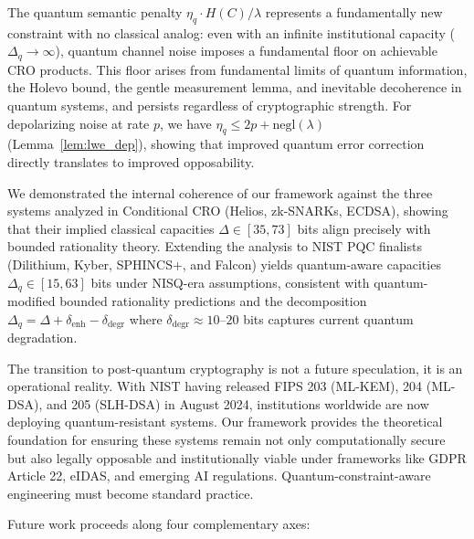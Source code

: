 \documentclass{ieeeaccess}
\begin{document}
The quantum semantic penalty $\eta_q \cdot H(C)/\lambda$ represents a fundamentally 
new constraint with no classical analog: even with an infinite institutional capacity 
($\Delta_q \to \infty$), quantum channel noise imposes a fundamental floor on 
achievable CRO products. This floor arises from fundamental limits of quantum 
information, the Holevo bound, the gentle measurement lemma, and inevitable 
decoherence in quantum systems, and persists regardless of cryptographic strength. 
For depolarizing noise at rate $p$, we have $\eta_q \leq 2p + \mathrm{negl}(\lambda)$ 
(Lemma~\ref{lem:lwe_dep}), showing that improved quantum error correction directly 
translates to improved opposability.

We demonstrated the internal coherence of our framework against the three systems 
analyzed in Conditional CRO (Helios, zk-SNARKs, ECDSA), showing that their implied 
classical capacities $\Delta \in [35,73]$ bits align precisely with bounded rationality 
theory. Extending the analysis to NIST PQC finalists (Dilithium, Kyber, SPHINCS+, 
and Falcon) yields quantum-aware capacities $\Delta_q \in [15,63]$ bits under NISQ-era 
assumptions, consistent with quantum-modified bounded rationality predictions and 
the decomposition $\Delta_q = \Delta + \delta_{\text{enh}} - \delta_{\text{degr}}$ 
where $\delta_{\text{degr}} \approx 10$--$20$ bits captures current quantum degradation.

The transition to post-quantum cryptography is not a future speculation, it is 
an operational reality. With NIST having released FIPS 203 (ML-KEM), 204 (ML-DSA), 
and 205 (SLH-DSA) in August 2024, institutions worldwide are now deploying 
quantum-resistant systems. Our framework provides the theoretical foundation 
for ensuring these systems remain not only computationally secure but also 
legally opposable and institutionally viable under frameworks like GDPR 
Article 22, eIDAS, and emerging AI regulations. Quantum-constraint-aware 
engineering must become standard practice.

Future work proceeds along four complementary axes:
\end{document}
